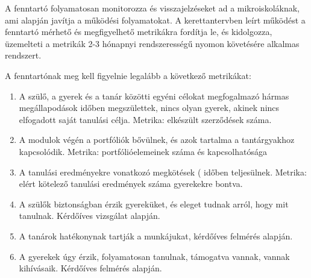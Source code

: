 A fenntartó folyamatosan monitorozza és visszajelzéseket ad a mikroiskoláknak,
ami alapján javítja a működési folyamatokat. A kerettantervben leírt működést a
fenntartó mérhető és megfigyelhető metrikákra fordítja le, és kidolgozza,
üzemelteti a metrikák 2-3 hónapnyi rendszerességű nyomon követésére alkalmas
rendszert.

A fenntartónak meg kell figyelnie legalább a következő metrikákat:
\begin{enumerate}
      \item A szülő, a gyerek és a tanár közötti egyéni célokat megfogalmazó
            hármas
            megállapodások időben megszülettek, nincs olyan gyerek, akinek
            nincs
            elfogadott
            saját tanulási célja. Metrika: elkészült szerződések száma.

      \item A modulok végén a portfóliók bővülnek, és azok tartalma a
            tantárgyakhoz
            kapcsolódik. Metrika: portfólióelemeinek száma és kapcsolhatósága
      \item A tanulási eredményekre vonatkozó megkötések
            ( időben teljesülnek.
            Metrika: elért kötelező tanulási eredmények száma gyerekekre bontva.

      \item A szülők biztonságban érzik gyereküket, és eleget tudnak arról,
            hogy
            mit
            tanulnak. Kérdőíves vizsgálat alapján.

      \item A tanárok hatékonynak tartják a munkájukat, kérdőíves felmérés
            alapján.

      \item A gyerekek úgy érzik, folyamatosan tanulnak, támogatva vannak,
            vannak
            kihívásaik. Kérdőíves felmérés alapján.
\end{enumerate}
